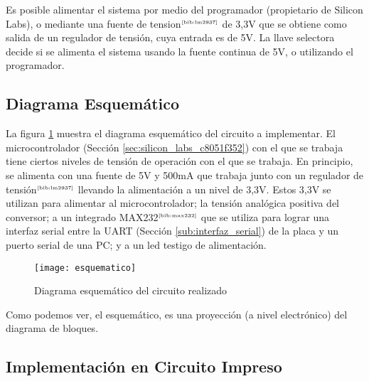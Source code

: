 Es posible alimentar el sistema por medio del programador (propietario de Silicon Labs), o mediante una fuente de tension$^{\tiny{\cite{bib:lm2937}}}$ de 3,3V que se obtiene como salida de un regulador de tensión, cuya entrada es de 5V. La llave selectora decide si se alimenta el sistema usando la fuente continua de 5V, o utilizando el programador.




\subsection{Diagrama Esquemático} %
\label{sub:diagrama_esquematico}

La figura \ref{fig:esquematico} muestra el diagrama esquemático del circuito a implementar. El microcontrolador (Sección \ref{sec:silicon_labs_c8051f352}) con el que se trabaja tiene ciertos niveles de tensión de operación con el que se trabaja. En principio, se alimenta con una fuente de 5V y 500mA que trabaja junto con un regulador de tensión$^{\tiny{\cite{bib:lm2937}}}$ llevando la alimentación a un nivel de 3,3V. Estos 3,3V se utilizan para alimentar al microcontrolador; la tensión analógica positiva del conversor; a un integrado MAX232$^{\tiny{\cite{bib:max232}}}$ que se utiliza para lograr una interfaz serial entre la UART (Sección \ref{sub:interfaz_serial}) de la placa y un puerto serial de una PC; y a un led testigo de alimentación.

\begin{figure}[H]
  \centering
  \texttt{[image: esquematico]}
  \caption{\small Diagrama esquemático del circuito realizado}\label{fig:esquematico}
\end{figure}

Como podemos ver, el esquemático, es una proyección (a nivel electrónico) del diagrama de bloques. %


\subsection{Implementación en Circuito Impreso} %
\label{sub:implementacion_en_circuito_impreso}

